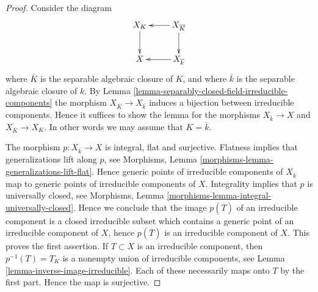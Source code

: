 \documentclass[10pt,a4paper]{amsart}
\theoremstyle{plain}
\theoremstyle{definition}
\theoremstyle{remark}
\numberwithin{equation}{subsection}
\begin{document}
\begin{proof}
Consider the diagram
$$
\xymatrix{
X_K \ar[d] & X_{\overline{K}} \ar[d] \ar[l] \\
X & X_{\overline{k}} \ar[l]
}
$$
where $\overline{K}$ is the separable algebraic closure of $K$, and
where $\overline{k}$ is the separable algebraic closure of $k$. By
Lemma \ref{lemma-separably-closed-field-irreducible-components}
the morphism $X_{\overline{K}} \to X_{\overline{k}}$ induces
a bijection between irreducible components. Hence it suffices
to show the lemma for the morphisms
$X_{\overline{k}} \to X$ and $X_{\overline{K}} \to X_K$.
In other words we may assume that $K = \overline{k}$.

\medskip\noindent
The morphism $p : X_{\overline{k}} \to X$ is integral, flat and surjective.
Flatness implies that generalizations lift along $p$, see
Morphisms, Lemma \ref{morphisms-lemma-generalizations-lift-flat}.
Hence generic points of irreducible components of $X_{\overline{k}}$
map to generic points of irreducible components of $X$.
Integrality implies that $p$ is universally closed, see
Morphisms, Lemma \ref{morphisms-lemma-integral-universally-closed}.
Hence we conclude that the image $p(\overline{T})$ of an irreducible component
is a closed irreducible subset which contains a generic point of an
irreducible component of $X$, hence $p(\overline{T})$
is an irreducible component of $X$. This proves the first assertion.
If $T \subset X$ is an irreducible component, then $p^{-1}(T) =T_K$
is a nonempty union of irreducible components, see
Lemma \ref{lemma-inverse-image-irreducible}.
Each of these necessarily maps onto $T$ by the first part.
Hence the map is surjective.
\end{proof}
\end{document}
